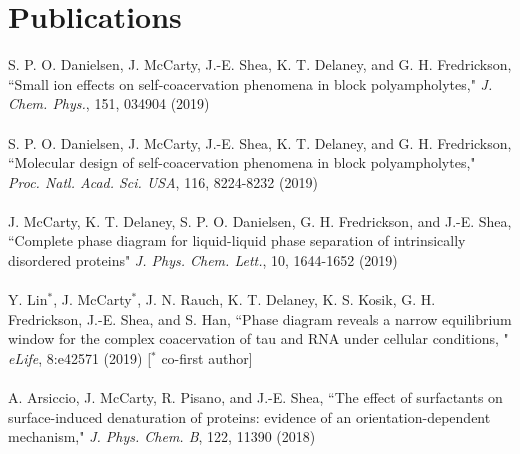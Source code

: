 \documentclass[10pt]{article} %
\begin{document}
\section{Publications}
S. P. O. Danielsen, J. McCarty, J.-E. Shea, K. T. Delaney, and G. H. Fredrickson, ``Small ion effects on self-coacervation phenomena in block polyampholytes,"  {\it J. Chem. Phys.}, 151, 034904 (2019) \\
\\
S. P. O. Danielsen, J. McCarty, J.-E. Shea, K. T. Delaney, and G. H. Fredrickson, ``Molecular design of self-coacervation phenomena in block polyampholytes," {\it Proc. Natl. Acad. Sci. USA}, 116, 8224-8232 (2019) \\
\\
J. McCarty, K. T. Delaney, S. P. O. Danielsen, G. H. Fredrickson, and J.-E. Shea, ``Complete phase diagram for liquid-liquid phase separation of intrinsically disordered proteins" {\it J. Phys. Chem. Lett.}, 10, 1644-1652  (2019)\\
\\
Y. Lin$^*$, J. McCarty$^*$, J. N. Rauch, K. T. Delaney, K. S. Kosik, G. H. Fredrickson, J.-E. Shea, and S. Han, ``Phase diagram reveals a narrow equilibrium window for the complex coacervation of tau and RNA under cellular conditions, " {\it eLife}, 8:e42571 (2019) [$^*$ co-first author]\\
\\
A. Arsiccio, J. McCarty, R. Pisano, and J.-E. Shea, ``The effect of surfactants on surface-induced denaturation of proteins: evidence of an orientation-dependent mechanism," {\it J. Phys. Chem. B}, 122, 11390 (2018)\\
\end{document}
